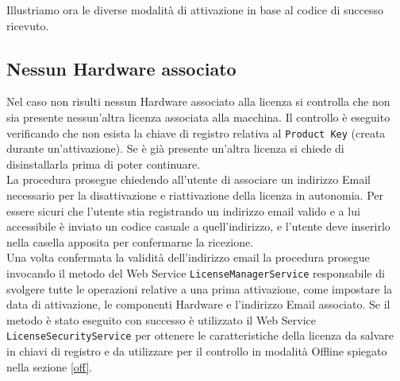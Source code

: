Illustriamo ora le diverse modalità di attivazione in base al codice di successo ricevuto.


\subsection{Nessun Hardware associato}
\label{nha}

Nel caso non risulti nessun Hardware associato alla licenza si controlla che non sia presente nessun’altra licenza associata alla macchina. Il controllo è eseguito verificando che non esista la chiave di registro relativa al \texttt{Product Key} (creata durante un'attivazione). Se è già presente un’altra licenza si chiede di disinstallarla prima di poter continuare.
\\La procedura prosegue chiedendo all’utente di associare un indirizzo Email necessario per la disattivazione e riattivazione della licenza in autonomia. 
Per essere sicuri che l’utente stia registrando un indirizzo email valido e a lui accessibile è inviato un codice casuale a quell’indirizzo, e l’utente deve inserirlo nella casella apposita per confermarne la ricezione. 
\\Una volta confermata la validità dell'indirizzo email la procedura prosegue invocando il metodo del Web Service \texttt{LicenseManagerService} responsabile di svolgere tutte le operazioni relative a una prima attivazione, come impostare la data di attivazione, le componenti Hardware e l'indirizzo Email associato. Se il metodo è stato eseguito con successo è utilizzato il Web Service \texttt{LicenseSecurityService} per ottenere le caratteristiche della licenza da salvare in chiavi di registro e da utilizzare per il controllo in modalità Offline spiegato nella sezione \ref{off}. 


